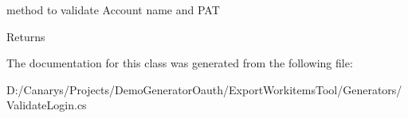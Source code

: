 method to validate Account name and P\+AT 

\begin{DoxyReturn}{Returns}

\end{DoxyReturn}


The documentation for this class was generated from the following file\+:\begin{DoxyCompactItemize}
\item 
D\+:/\+Canarys/\+Projects/\+Demo\+Generator\+Oauth/\+Export\+Workitems\+Tool/\+Generators/Validate\+Login.\+cs\end{DoxyCompactItemize}
